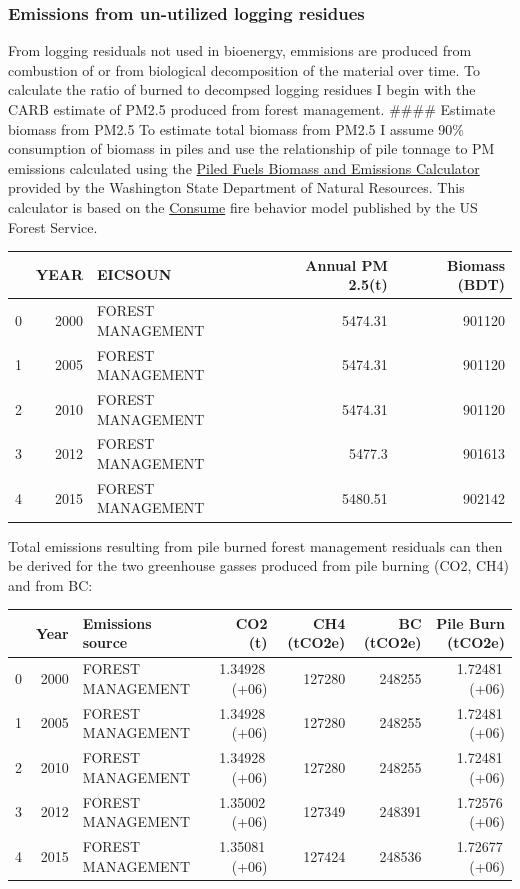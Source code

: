 \documentclass[a4paper]{article}
\begin{document}
\subsubsection{Emissions from un-utilized logging residues}
\label{sec:orgheadline8}

From logging residuals not used in bioenergy, emmisions are produced
from combustion of or from biological decomposition of the
material over time. To calculate the ratio of burned to decompsed
logging residues I begin with the CARB estimate of PM2.5 produced from
forest management. \#\#\#\# Estimate biomass from PM2.5 To estimate total
biomass from PM2.5 I assume 90\% consumption of biomass in piles and use
the relationship of pile tonnage to PM emissions calculated using the
\href{http://depts.washington.edu/nwfire/piles/}{Piled Fuels Biomass and Emissions Calculator} provided by the Washington State Department of
Natural Resources. This calculator is based on the \href{http://www.fs.fed.us/pnw/fera/research/smoke/consume/index.shtml}{Consume} fire behavior model published by the US Forest Service.

\begin{center}
\begin{tabular}{rrlrr}
 & YEAR & EICSOUN & Annual PM 2.5(t) & Biomass (BDT)\\
\hline
0 & 2000 & FOREST MANAGEMENT & 5474.31 & 901120\\
1 & 2005 & FOREST MANAGEMENT & 5474.31 & 901120\\
2 & 2010 & FOREST MANAGEMENT & 5474.31 & 901120\\
3 & 2012 & FOREST MANAGEMENT & 5477.3 & 901613\\
4 & 2015 & FOREST MANAGEMENT & 5480.51 & 902142\\
\end{tabular}

\end{center}

Total emissions resulting from pile burned forest management residuals
can then be derived for the two greenhouse gasses produced from pile
burning (CO2, CH4) and from BC:

\begin{center}
\begin{tabular}{rrlrrrr}
 & Year & Emissions source & CO2 (t) & CH4 (tCO2e) & BC (tCO2e) & Pile Burn (tCO2e)\\
\hline
0 & 2000 & FOREST MANAGEMENT & 1.34928\,(+06) & 127280 & 248255 & 1.72481\,(+06)\\
1 & 2005 & FOREST MANAGEMENT & 1.34928\,(+06) & 127280 & 248255 & 1.72481\,(+06)\\
2 & 2010 & FOREST MANAGEMENT & 1.34928\,(+06) & 127280 & 248255 & 1.72481\,(+06)\\
3 & 2012 & FOREST MANAGEMENT & 1.35002\,(+06) & 127349 & 248391 & 1.72576\,(+06)\\
4 & 2015 & FOREST MANAGEMENT & 1.35081\,(+06) & 127424 & 248536 & 1.72677\,(+06)\\
\end{tabular}

\end{center}
\end{document}
